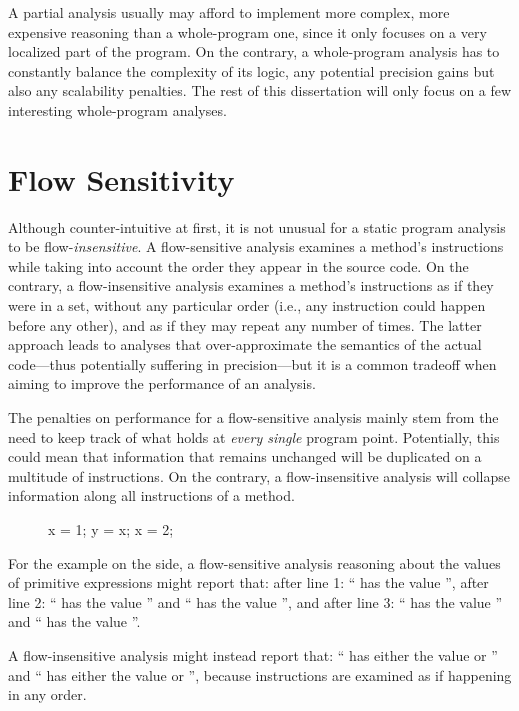 A partial analysis usually may afford to implement more complex, more expensive reasoning than a whole-program one, since it only focuses on a very localized part of the program. On the contrary, a whole-program analysis has to constantly balance the complexity of its logic, any potential precision gains but also any scalability penalties. The rest of this dissertation will only focus on a few interesting whole-program analyses.


\section{Flow Sensitivity}
\label{sec:back:flowSensitivity}

Although counter-intuitive at first, it is not unusual for a static program analysis to be flow-\emph{insensitive}. A flow-sensitive analysis examines a method's instructions while taking into account the order they appear in the source code. On the contrary, a flow-insensitive analysis examines a method's instructions as if they were in a set, without any particular order (i.e., any instruction could happen before any other), and as if they may repeat any number of times. The latter approach leads to analyses that over-approximate the semantics of the actual code---thus potentially suffering in precision---but it is a common tradeoff when aiming to improve the performance of an analysis.

The penalties on performance for a flow-sensitive analysis mainly stem from the need to keep track of what holds at \emph{every single} program point. Potentially, this could mean that information that remains unchanged will be duplicated on a multitude of instructions. On the contrary, a flow-insensitive analysis will collapse information along all instructions of a method.

{
\setlength\intextsep{-10pt}
\begin{figure}
\centering
\begin{javacode}
x = 1;
y = x;
x = 2;
\end{javacode}
\end{figure}

For the example on the side, a flow-sensitive analysis reasoning about the values of primitive expressions might report that:
after line 1: `` has the value '',
after line 2: `` has the value '' and `` has the value '', and
after line 3: `` has the value '' and `` has the value ''.

A flow-insensitive analysis might instead report that:
`` has either the value  or '' and
`` has either the value  or '',
because instructions are examined as if happening in any order.
}



